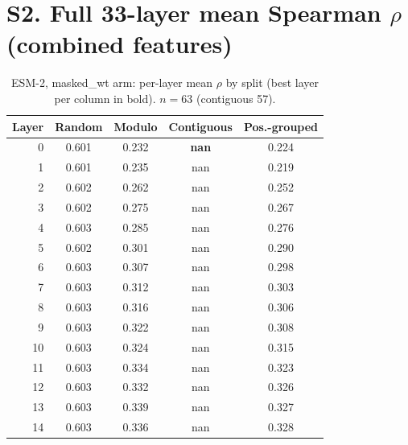 \documentclass[11pt,a4paper]{article}
\begin{document}
\section*{S2. Full 33-layer mean Spearman $\rho$ (combined features)}

\begin{table}[H]\centering\small

\caption{ESM-2, masked\_wt arm: per-layer mean $\rho$ by split (best layer per column in bold). $n=63$ (contiguous 57).}

\label{tab:S2ESM-2masked_wt}

\begin{tabular}{rcccc}

\toprule

Layer & Random & Modulo & Contiguous & Pos.-grouped \\

\midrule

0 & 0.601 & 0.232 & \textbf{nan} & 0.224 \\

1 & 0.601 & 0.235 & nan & 0.219 \\

2 & 0.602 & 0.262 & nan & 0.252 \\

3 & 0.602 & 0.275 & nan & 0.267 \\

4 & 0.603 & 0.285 & nan & 0.276 \\

5 & 0.602 & 0.301 & nan & 0.290 \\

6 & 0.603 & 0.307 & nan & 0.298 \\

7 & 0.603 & 0.312 & nan & 0.303 \\

8 & 0.603 & 0.316 & nan & 0.306 \\

9 & 0.603 & 0.322 & nan & 0.308 \\

10 & 0.603 & 0.324 & nan & 0.315 \\

11 & 0.603 & 0.334 & nan & 0.323 \\

12 & 0.603 & 0.332 & nan & 0.326 \\

13 & 0.603 & 0.339 & nan & 0.327 \\

14 & 0.603 & 0.336 & nan & 0.328 \\


\end{tabular}
\end{table}
\end{document}
